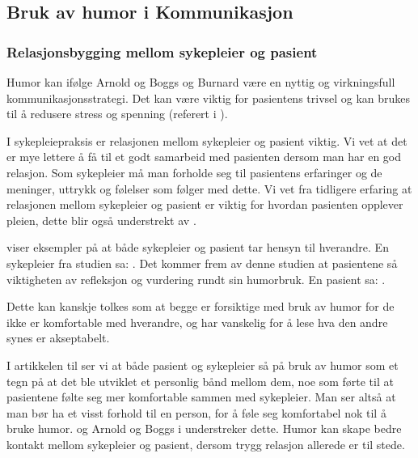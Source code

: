 \subsection{Bruk av humor i Kommunikasjon}

\subsubsection{Relasjonsbygging mellom sykepleier og pasient}
\label{disk.relbygg}

Humor kan ifølge Arnold og Boggs og Burnard være en nyttig og virkningsfull
kommunikasjonsstrategi. Det kan være viktig for pasientens trivsel og kan
brukes til å redusere stress og spenning (referert i ).

I sykepleiepraksis er relasjonen mellom sykepleier og pasient viktig. Vi vet at
det er mye lettere å få til et godt samarbeid med pasienten dersom man har en
god relasjon. Som sykepleier må man forholde seg til pasientens erfaringer og
de meninger, uttrykk og følelser som følger med dette. Vi vet fra tidligere
erfaring at relasjonen mellom sykepleier og pasient er viktig for hvordan
pasienten opplever pleien, dette blir også understrekt av .

 viser eksempler på at både sykepleier og pasient tar hensyn
til hverandre. En sykepleier fra studien sa:
. Det kommer frem av denne studien at pasientene så viktigheten av
refleksjon og vurdering rundt sin humorbruk. En pasient sa:
.

Dette kan kanskje tolkes som at begge er forsiktige med bruk av humor for de
ikke er komfortable med hverandre, og har vanskelig for å lese hva den andre
synes er akseptabelt.

I artikkelen til  ser vi at både pasient og sykepleier så på
bruk av humor som et tegn på at det ble utviklet et personlig bånd mellom dem,
noe som førte til at pasientene følte seg mer komfortable sammen med
sykepleier. Man ser altså at man bør ha et visst forhold til en person, for å
føle seg komfortabel nok til å bruke humor.  og Arnold
og Boggs i  understreker dette. Humor kan skape bedre kontakt
mellom sykepleier og pasient, dersom trygg relasjon allerede er til stede.

